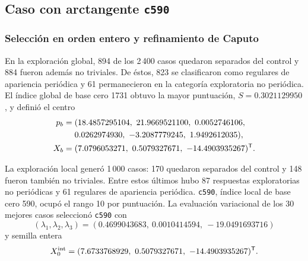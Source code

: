 \FloatBarrier
\subsection{Caso con arctangente \texttt{c590}}
\label{subsec:resultados_c590}

\subsubsection{Selección en orden entero y refinamiento de Caputo}

En la exploración global, 894 de los 2\,400 casos quedaron separados del
control y 884 fueron además no triviales. De éstos, 823 se clasificaron como
regulares de apariencia periódica y 61 permanecieron en la categoría
exploratoria no periódica. El índice global de base cero 1731 obtuvo la mayor
puntuación, \(S=0.3021129950\), y definió el centro
\begin{equation}
\begin{aligned}
p_b={}&(18.4857295104,\ 21.9669521100,\ 0.0052746106,\\
&0.0262974930,\ -3.2087779245,\ 1.9492612035),\\
X_b={}&(7.0796053271,\ 0.5079327671,\ -14.4903935267)^{\mathsf T}.
\end{aligned}
\label{eq:resultado_centro_c590}
\end{equation}

La exploración local generó 1\,000 casos: 170 quedaron separados del control
y 148 fueron también no triviales. Entre estos últimos hubo 87 respuestas
exploratorias no periódicas y 61 regulares de apariencia periódica.
\texttt{c590}, índice local de base cero 590, ocupó el rango 10 por puntuación.
La evaluación variacional de los 30 mejores casos seleccionó \texttt{c590} con
\begin{equation}
(\lambda_1,\lambda_2,\lambda_3)
=(0.4699043683,\ 0.0010414594,\ -19.0491693716)
\label{eq:resultado_lyapunov_entero_c590}
\end{equation}
y semilla entera
\begin{equation}
X_0^{\mathrm{int}}
=(7.6733768929,\ 0.5079327671,\ -14.4903935267)^{\mathsf T}.
\label{eq:resultado_semilla_entera_c590}
\end{equation}

